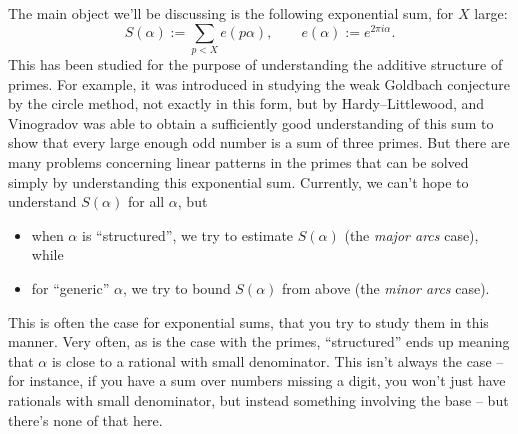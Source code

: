 \documentclass[reqno]{amsart} 
\begin{document}
The main object we'll be discussing is the following exponential sum, for $X$ large:
\begin{equation*}
  S(\alpha) :=   \sum_{p < X} e(p \alpha), \qquad
  e(\alpha) := e^{2 \pi i \alpha}.
\end{equation*}
This has been studied for the purpose of understanding the additive structure of primes.  For example, it was introduced in studying the weak Goldbach conjecture by the circle method, not exactly in this form, but by Hardy--Littlewood, and Vinogradov was able to obtain a sufficiently good understanding of this sum to show that every large enough odd number is a sum of three primes.   But there are many problems concerning linear patterns in the primes that can be solved simply by understanding this exponential sum.  Currently, we can't hope to understand $S(\alpha)$ for all $\alpha$, but
\begin{itemize}
\item when $\alpha$ is ``structured'', we try to estimate $S(\alpha)$ (the \emph{major arcs} case), while
\item for ``generic'' $\alpha$, we try to bound $S(\alpha)$ from above (the \emph{minor arcs} case).
\end{itemize}
This is often the case for exponential sums, that you try to study them in this manner.  Very often, as is the case with the primes, ``structured'' ends up meaning that $\alpha$ is close to a rational with small denominator.  This isn't always the case -- for instance, if you have a sum over numbers missing a digit, you won't just have rationals with small denominator, but instead something involving the base -- but there's none of that here.
\end{document}
